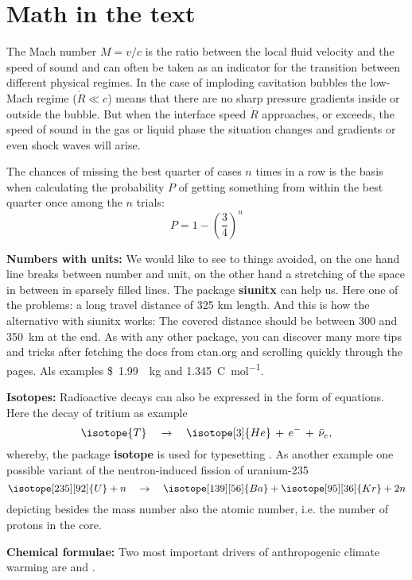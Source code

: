 \chapter{Math in the text}%

The Mach number $M=v/c$ is the ratio between the local fluid velocity and the speed of sound and can often be taken as an indicator for the transition between different physical regimes. In the case of imploding cavitation bubbles the low-Mach regime ($\dot{R}\ll c$) means that there are no sharp pressure gradients inside or outside the bubble. But when the interface speed $\dot{R}$ approaches, or exceeds, the speed of sound in the gas or liquid phase the situation changes and gradients or even shock waves will arise.

The chances of missing the best quarter of cases $n$ times in a row is the basis when calculating the probability $P$ of getting something from within the best quarter once among the $n$ trials:
\begin{equation}
P=1-\left( \frac{3}{4} \right)^n
\end{equation}


\textbf{Numbers with units:} We would like to see to things avoided, on the one hand line breaks between number and unit, on the other hand a stretching of the space in between in sparsely filled lines. The package \textbf{siunitx} can help us. Here one of the problems: a long travel distance of 325 km length. And this is how the alternative with siunitx works: The covered distance should be between \num{300} and \SI{350}{\kilo\meter} at the end. As with any other package, you can discover many more tips and tricks after fetching the docs from ctan.org and scrolling quickly through the pages. Als examples \SI[per-mode=symbol]{1.99}[\$]{\per\kilogram} and \SI[per-mode=fraction]{1,345}{\coulomb\per\mole}.

\textbf{Isotopes:} Radioactive decays can also be expressed in the form of equations. Here the decay of tritium as example
\begin{equation}
  \isotope{T}  \quad \rightarrow \quad \isotope[3]{He}\,+\,e^{-}\,+\,\bar{\nu}_e,  \label{eq_T_decay}
\end{equation}
whereby, the package \textbf{isotope} is used for typesetting . As another example one possible variant of the neutron-induced fission of uranium-235
\begin{equation}
  \isotope[235][92]{U} + n \quad \rightarrow \quad \isotope[139][56]{Ba} + \isotope[95][36]{Kr} + 2n
\end{equation}
depicting besides the mass number also the atomic number, i.e. the number of protons in the core.

\textbf{Chemical formulae:} Two most important drivers of anthropogenic climate warming are  and .

